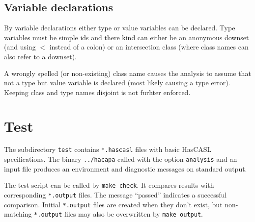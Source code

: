 \documentclass{article}
\begin{document}
\subsection{Variable declarations}

By variable declarations either type or value variables can be declared.
Type variables must be simple ids and there kind can either be an anonymous
downset (and using $<$ instead of a colon) or an intersection class (where
class names can also refer to a downset).

A wrongly spelled (or non-existing) class name causes the analysis to assume
that not a type but value variable is declared (most likely causing a type
error). Keeping class and type names disjoint is not furhter enforced.


\section{Test}

The subdirectory \texttt{test} contains \texttt{*.hascasl} files with basic
HasCASL specifications. The binary \texttt{../hacapa} called with the option
\texttt{analysis} and an input file produces an environment and diagnostic
messages on standard output. 

The test script can be called by \texttt{make check}. It compares results with
corresponding \texttt{*.output} files. The message ``passed'' indicates a
successful comparison. Initial \texttt{*.output} files are created when they
don't exist, but non-matching \texttt{*.output} files may also be overwritten
by \texttt{make output}.
\end{document}
